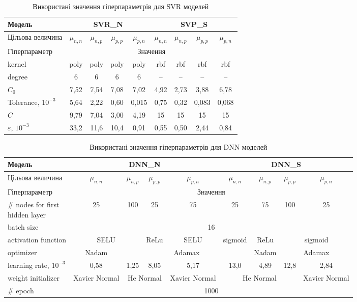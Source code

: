 \documentclass[12pt,a4paper,titlepage,oneside]{book}
\numberwithin{equation}{part}
\begin{document}
\begin{table}[!ht]
\setlength{\tabcolsep}{3pt}
\caption{Використані значення гіперпараметрів для SVR моделей}
\label{tblSVRrez}
\centering
\begin{tabular}{|l|c|c|c|c|c|c|c|c|}
\hline
Модель& \multicolumn{4}{c|}{SVR\_N}& \multicolumn{4}{c|}{SVP\_S} \rule{0pt}{11pt}\\
\hline
Цільова величина&$\mu_{n,n}$&$\mu_{n,p}$&$\mu_{p,p}$&$\mu_{p,n}$&$\mu_{n,n}$&$\mu_{n,p}$&$\mu_{p,p}$&$\mu_{p,n}$\\
\hline
Гіперпараметр&\multicolumn{8}{c|}{Значення}\\
\hline
kernel &poly&poly&poly&poly&rbf&rbf&rbf&rbf\\
\hline
degree&6&6&6&6&--&--&--&--\\
\hline
$C_0$ &7,52&7,54&7,08&7,02&4,92&2,73&3,88&6,78\\
\hline
Tolerance, $10^{-3}$&5,64&2,22&0,60&0,015&0,75&0,32&0,083&0,068\\
\hline
$C$	&9,79&7,04&3,00&4,19&15&15&15&15\\
\hline
$\varepsilon$, $10^{-3}$ &33,2&11,6&10,4&0,91&0,55&0,50&2,44&0,84\\
\hline
\end{tabular}
\end{table}

\begin{table}[!ht]
\setlength{\tabcolsep}{1pt}
\caption{Використані значення гіперпараметрів для DNN моделей}
\label{tblDNNrez}
\centering
\begin{tabular}{|l|c|c|c|c|c|c|c|c|}
\hline
Модель& \multicolumn{4}{c|}{DNN\_N}& \multicolumn{4}{c|}{DNN\_S} \rule{0pt}{11pt}\\
\hline
Цільова величина&$\mu_{n,n}$&$\mu_{n,p}$&$\mu_{p,p}$&$\mu_{p,n}$&$\mu_{n,n}$&$\mu_{n,p}$&$\mu_{p,p}$&$\mu_{p,n}$\\
\hline
Гіперпараметр&\multicolumn{8}{c|}{Значення}\\
\hline
\makecell{\# nodes for first \\hidden layer} &25&100&25&75&25&75&100&25\\
\hline
batch size&\multicolumn{8}{c|}{16}\\
\hline
activation function &\multicolumn{2}{c|}{SELU}&ReLu&SELU&sigmoid&ReLu&\multicolumn{2}{c|}{sigmoid}\\
\hline
optimizer	&Nadam&\multicolumn{4}{c|}{Adamax}&Nadam&\multicolumn{2}{c|}{Adamax}\\
\hline
learning rate, $10^{-3}$	&0,58&1,25&8,05&5,17&13,0&4,89&12,8&2,84\\
\hline
weight initializer &Xavier Normal&\multicolumn{2}{c|}{He Normal}&Xavier Normal&\multicolumn{3}{c|}{He Normal}&Xavier Normal\\
\hline
\# epoch &\multicolumn{8}{c|}{1000}\\
\hline
\end{tabular}
\end{table}
\end{document}
